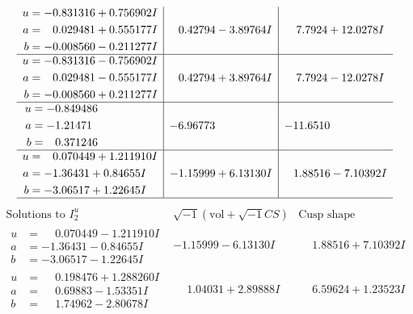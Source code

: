 \documentclass[1p]{elsarticle_modified}
\theoremstyle{definition}
\newcommand{\I}{\sqrt{-1}}
\begin{document}
$$\begin{array}{c|c|c}
\begin{aligned}
u &= -0.831316 + 0.756902 I \\
a &= \phantom{-}0.029481 + 0.555177 I \\
b &= -0.008560 - 0.211277 I\end{aligned}
 & \phantom{-}0.42794 - 3.89764 I & \phantom{-}7.7924 + 12.0278 I \\ \hline\begin{aligned}
u &= -0.831316 - 0.756902 I \\
a &= \phantom{-}0.029481 - 0.555177 I \\
b &= -0.008560 + 0.211277 I\end{aligned}
 & \phantom{-}0.42794 + 3.89764 I & \phantom{-}7.7924 - 12.0278 I \\ \hline\begin{aligned}
u &= -0.849486\phantom{ +0.000000I} \\
a &= -1.21471\phantom{ +0.000000I} \\
b &= \phantom{-}0.371246\phantom{ +0.000000I}\end{aligned}
 & -6.96773\phantom{ +0.000000I} & -11.6510\phantom{ +0.000000I} \\ \hline\begin{aligned}
u &= \phantom{-}0.070449 + 1.211910 I \\
a &= -1.36431 + 0.84655 I \\
b &= -3.06517 + 1.22645 I\end{aligned}
 & -1.15999 + 6.13130 I & \phantom{-}1.88516 - 7.10392 I\\
 \hline 
 \end{array}$$\newpage$$\begin{array}{c|c|c}  
\text{Solutions to }I^u_{2}& \I (\text{vol} + \sqrt{-1}CS) & \text{Cusp shape}\\
 \hline 
\begin{aligned}
u &= \phantom{-}0.070449 - 1.211910 I \\
a &= -1.36431 - 0.84655 I \\
b &= -3.06517 - 1.22645 I\end{aligned}
 & -1.15999 - 6.13130 I & \phantom{-}1.88516 + 7.10392 I \\ \hline\begin{aligned}
u &= \phantom{-}0.198476 + 1.288260 I \\
a &= \phantom{-}0.69883 - 1.53351 I \\
b &= \phantom{-}1.74962 - 2.80678 I\end{aligned}
 & \phantom{-}1.04031 + 2.89888 I & \phantom{-}6.59624 + 1.23523 I \\ \hline\begin{aligned}

\end{aligned}
\end{array}$$
\end{document}
